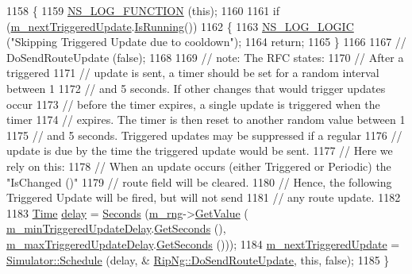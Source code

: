 \begin{DoxyCode}
1158 \{
1159   \hyperlink{log-macros-disabled_8h_a90b90d5bad1f39cb1b64923ea94c0761}{NS\_LOG\_FUNCTION} (\textcolor{keyword}{this});
1160 
1161   \textcolor{keywordflow}{if} (\hyperlink{classns3_1_1RipNg_a382578c16a30ce7de28794defeb661e9}{m\_nextTriggeredUpdate}.\hyperlink{classns3_1_1EventId_aabf8476d1a080c199ea0c6aa9ccea372}{IsRunning}())
1162     \{
1163       \hyperlink{group__logging_ga88acd260151caf2db9c0fc84997f45ce}{NS\_LOG\_LOGIC} (\textcolor{stringliteral}{"Skipping Triggered Update due to cooldown"});
1164       \textcolor{keywordflow}{return};
1165     \}
1166 
1167   \textcolor{comment}{// DoSendRouteUpdate (false);}
1168 
1169   \textcolor{comment}{// note: The RFC states:}
1170   \textcolor{comment}{//     After a triggered}
1171   \textcolor{comment}{//     update is sent, a timer should be set for a random interval between 1}
1172   \textcolor{comment}{//     and 5 seconds.  If other changes that would trigger updates occur}
1173   \textcolor{comment}{//     before the timer expires, a single update is triggered when the timer}
1174   \textcolor{comment}{//     expires.  The timer is then reset to another random value between 1}
1175   \textcolor{comment}{//     and 5 seconds.  Triggered updates may be suppressed if a regular}
1176   \textcolor{comment}{//     update is due by the time the triggered update would be sent.}
1177   \textcolor{comment}{// Here we rely on this:}
1178   \textcolor{comment}{// When an update occurs (either Triggered or Periodic) the "IsChanged ()"}
1179   \textcolor{comment}{// route field will be cleared.}
1180   \textcolor{comment}{// Hence, the following Triggered Update will be fired, but will not send}
1181   \textcolor{comment}{// any route update.}
1182 
1183   \hyperlink{namespacens3_1_1TracedValueCallback_a7ffd3e7c142ffe7c8a1d2db9b8de38ec}{Time} \hyperlink{lte_2model_2fading-traces_2fading__trace__generator_8m_a7964e6aa8f61a9d28973c8267a606ad8}{delay} = \hyperlink{group__timecivil_ga33c34b816f8ff6628e33d5c8e9713b9e}{Seconds} (\hyperlink{classns3_1_1RipNg_adc89174a768de707315ed3cb88a6a0aa}{m\_rng}->\hyperlink{classns3_1_1UniformRandomVariable_a03822d8c86ac51e9aa83bbc73041386b}{GetValue} (
      \hyperlink{classns3_1_1RipNg_a4da2b49a558678bd4c51a995fbfbf7af}{m\_minTriggeredUpdateDelay}.\hyperlink{classns3_1_1Time_a8f20d5c3b0902d7b4320982f340b57c8}{GetSeconds} (), 
      \hyperlink{classns3_1_1RipNg_a7087e78333b3a5caabc13a83753a13a2}{m\_maxTriggeredUpdateDelay}.\hyperlink{classns3_1_1Time_a8f20d5c3b0902d7b4320982f340b57c8}{GetSeconds} ()));
1184   \hyperlink{classns3_1_1RipNg_a382578c16a30ce7de28794defeb661e9}{m\_nextTriggeredUpdate} = \hyperlink{classns3_1_1Simulator_a671882c894a08af4a5e91181bf1eec13}{Simulator::Schedule} (delay, &
      \hyperlink{classns3_1_1RipNg_a110005349bf811e1b0f6af182298be15}{RipNg::DoSendRouteUpdate}, \textcolor{keyword}{this}, \textcolor{keyword}{false});
1185 \}
\end{DoxyCode}


